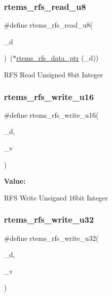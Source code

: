 \subsubsection{\texorpdfstring{rtems\_rfs\_read\_u8}{rtems\_rfs\_read\_u8}}
{\footnotesize\ttfamily \#define rtems\+\_\+rfs\+\_\+read\+\_\+u8(\begin{DoxyParamCaption}\item[{}]{\+\_\+d }\end{DoxyParamCaption})~($\ast$\mbox{\hyperlink{rtems-rfs-data_8h_a5fbf9f5b7233acca6b58f1208cd16aff}{rtems\+\_\+rfs\+\_\+data\+\_\+ptr}} (\+\_\+d))}

R\+FS Read Unsigned 8bit Integer \mbox{\label{rtems-rfs-data_8h_a7f9da284acf36ff50739fd3fd252f210}} 
\subsubsection{\texorpdfstring{rtems\_rfs\_write\_u16}{rtems\_rfs\_write\_u16}}
{\footnotesize\ttfamily \#define rtems\+\_\+rfs\+\_\+write\+\_\+u16(\begin{DoxyParamCaption}\item[{}]{\+\_\+d,  }\item[{}]{\+\_\+v }\end{DoxyParamCaption})}

{\bfseries Value\+:}
\begin{DoxyCode}{0}
\DoxyCodeLine{\textcolor{keywordflow}{do} \{ \(\backslash\)}

\end{DoxyCode}
R\+FS Write Unsigned 16bit Integer \mbox{\label{rtems-rfs-data_8h_a0e7b57b15dac03868caaeb7d2c8c1ba7}} 
\subsubsection{\texorpdfstring{rtems\_rfs\_write\_u32}{rtems\_rfs\_write\_u32}}
{\footnotesize\ttfamily \#define rtems\+\_\+rfs\+\_\+write\+\_\+u32(\begin{DoxyParamCaption}\item[{}]{\+\_\+d,  }\item[{}]{\+\_\+v }\end{DoxyParamCaption})}

